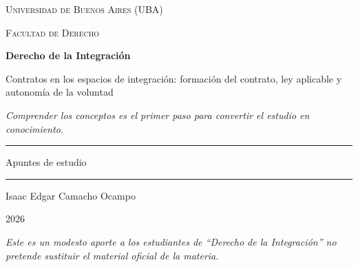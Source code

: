 \documentclass[12pt,oneside]{book}
\newcommand{\universidad}{Universidad de Buenos Aires (UBA)}
\newcommand{\facultad}{Facultad de Derecho}
\newcommand{\materia}{Derecho de la Integración}
\newcommand{\titulo}{Contratos en los espacios de integración: formación del contrato, ley aplicable y autonomía de la voluntad}
\newcommand{\autor}{Isaac Edgar Camacho Ocampo}
\newcommand{\anio}{2026}
\begin{document}
\begin{titlepage}

\thispagestyle{empty}

\begin{center}

\vspace*{1cm}

{\large \textsc{\universidad}}

\vspace{0.2cm}

{\large \textsc{\facultad}}

\vspace{2.5cm}

{\Huge \textbf{\materia}}

\vspace{1cm}

{\LARGE \titulo}

\vspace{0.8cm}

\textit{Comprender los conceptos es el primer paso para convertir el estudio en conocimiento.}

\vspace{1.2cm}

\rule{0.70\textwidth}{0.5pt}

\vspace{0.5cm}

{\large Apuntes de estudio}

\vspace{0.5cm}

\rule{0.70\textwidth}{0.5pt}

\vfill

{\large \autor}

\vspace{0.3cm}

{\large \anio}

\end{center}

\vfill

\begin{flushleft}
\textit{Este es un modesto aporte a los estudiantes de ``Derecho de la Integración'' no pretende sustituir el material oficial de la materia.}
\end{flushleft}

\end{titlepage}

\tableofcontents
\end{document}

